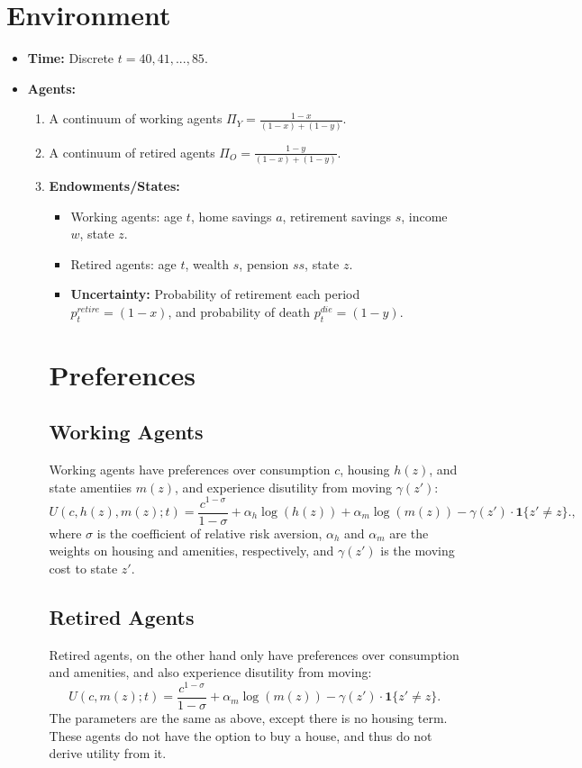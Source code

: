 \documentclass[12pt]{article}
\theoremstyle{remark}
\newcommand{\1}{\mathbf{1}}
\begin{document}
\section{Environment}
\begin{itemize}[leftmargin=1.2em]
  \item \textbf{Time:} Discrete $t=40, 41, ..., 85$. 
  \item \textbf{Agents:}
  \begin{enumerate}
    \item A continuum of working agents $\Pi_Y = \frac{1 -x}{(1-x) + (1-y)}$.
   \item A continuum of retired agents $\Pi_O = \frac{1 -y}{(1-x) + (1-y)}$.
  \item \textbf{Endowments/States:}
    \begin{itemize}
      \item Working agents: age $t$, home savings $a$, retirement savings $s$, income $w$, state $z$.
      \item Retired agents: age $t$, wealth $s$, pension $ss$, state $z$.
      \item \textbf{Uncertainty:} Probability of retirement each period $p^{retire}_t = (1-x)$, and probability of death $p^{die}_t = (1-y)$.
\end{itemize}

\section{Preferences}
    \subsection{Working Agents}
    Working agents have preferences over consumption $c$, housing $h(z)$, and state amentiies $m(z)$, and experience disutility from moving $\gamma(z')$:
    \begin{equation}
      U(c, h(z), m(z); t) = \frac{c^{1-\sigma}}{1 - \sigma} + \alpha_h \log(h(z)) + \alpha_m \log(m(z)) - \gamma(z') \cdot \1\{z' \neq z\}.,
    \end{equation}
    where $\sigma$ is the coefficient of relative risk aversion, $\alpha_h$ and $\alpha_m$ are the weights on housing and amenities,
    respectively, and $\gamma(z')$ is the moving cost to state $z'$.

    \subsection{Retired Agents}
    Retired agents, on the other hand only have preferences over consumption and amenities, and also experience disutility from moving:
    \begin{equation}
      U(c, m(z); t) = \frac{c^{1-\sigma}}{1 - \sigma} + \alpha_m \log(m(z)) - \gamma(z') \cdot \1\{z' \neq z\}.
    \end{equation}
    The parameters are the same as above, except there is no housing term. These agents do not have the option to buy a house, and thus do not derive utility from it.


\end{enumerate}
\end{itemize}
\end{document}
